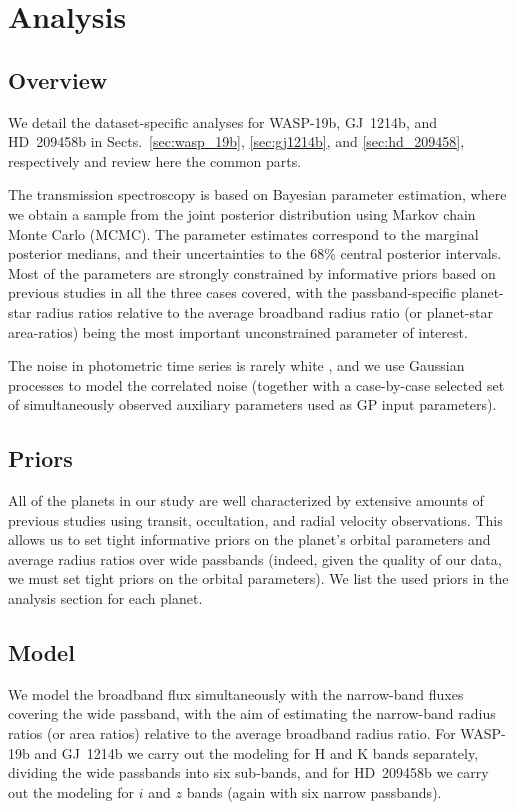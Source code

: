 \documentclass[useAMS,usenatbib]{mn2e}
\begin{document}
\section{Analysis}
\label{sec:analysis}
\subsection{Overview}
\label{sec:analysis:overview}

We detail the dataset-specific analyses for WASP-19b, GJ~1214b, and HD~209458b in Sects.~\ref{sec:wasp_19b}, 
\ref{sec:gj1214b}, and \ref{sec:hd_209458}, respectively and review here the common parts.

The transmission spectroscopy is based on Bayesian parameter estimation, where we obtain a sample from the joint 
posterior distribution using Markov chain Monte Carlo (MCMC). The parameter estimates correspond to the marginal 
posterior medians, and their uncertainties to the 68\% central posterior intervals. Most of the parameters are strongly 
constrained by informative priors based on previous studies in all the three cases covered, with the passband-specific 
planet-star radius ratios relative to the average broadband radius ratio (or planet-star area-ratios) being the most 
important unconstrained parameter of interest. 

The noise in photometric time series is rarely white \citep{Pont2006}, and we use Gaussian processes 
\citep[GPs,][]{Gibson2011a,Roberts2013,Rasmussen2006} to model the correlated noise (together with a case-by-case 
selected set of simultaneously observed auxiliary parameters used as GP input parameters).

\subsection{Priors}
\label{sec:analysis:priors}
All of the planets in our study are well characterized by extensive amounts of previous studies using transit, 
occultation, and radial velocity observations. This allows us to set tight informative priors on the planet's orbital 
parameters and average radius ratios over wide passbands (indeed, given the quality of our data, we must set tight 
priors on the orbital parameters). We list the used priors in the analysis section for each planet.

\subsection{Model}
\label{sec:analysis:model}
We model the broadband flux simultaneously with the narrow-band fluxes covering the wide passband, with the aim of 
estimating the narrow-band radius ratios (or area ratios) relative to the average broadband radius ratio. For WASP-19b 
and GJ~1214b we carry out the modeling for H and K bands separately, dividing the wide passbands into six sub-bands, 
and for HD~209458b we carry out the modeling for $i$ and $z$ bands (again with six narrow passbands).
\end{document}
